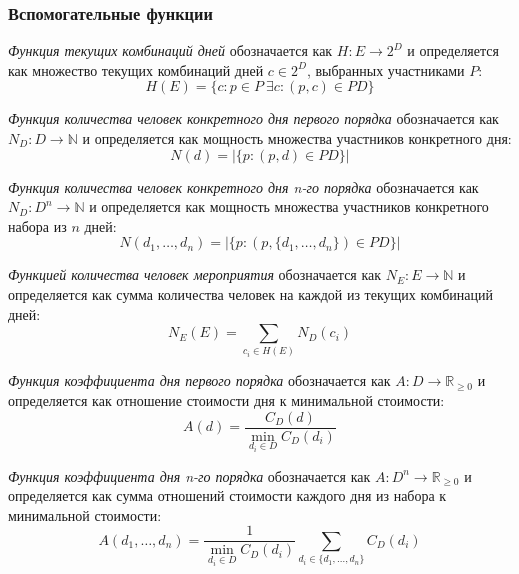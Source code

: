 \subsubsection{Вспомогательные функции}

\textit{Функция текущих комбинаций дней} обозначается как $H: E \rightarrow 2^D$ и определяется как множество текущих комбинаций дней $c \in 2^D$, выбранных участниками $P$:
\begin{equation}
	H(E) = \{c: p \in P \ \exists c: (p, c) \in PD\}
\end{equation}

\textit{Функция количества человек конкретного дня первого порядка} обозначается как $N_D: D \rightarrow \mathbb{N}$ и определяется как мощность множества участников конкретного дня:
\begin{equation}
	N(d) = |\{p: (p, d) \in PD\}|
\end{equation}

\textit{Функция количества человек конкретного дня n-го порядка} обозначается как $N_D: D^n \rightarrow \mathbb{N}$ и определяется как мощность множества участников конкретного набора из $n$ дней:
\begin{equation}
	N(d_1, \dots, d_n) = |\{p: (p, \{d_1, \dots, d_n\}) \in PD\}|
\end{equation}

\textit{Функцией количества человек мероприятия} обозначается как \newline $N_E: E \rightarrow \mathbb{N}$ и определяется как сумма количества человек на каждой из текущих комбинаций дней:
\begin{equation}
	N_E(E) = \sum_{c_i \in H(E)}{N_D(c_i)}
\end{equation}

\textit{Функция коэффициента дня первого порядка} обозначается как \newline $A: D \rightarrow \mathbb{R}_{\ge 0}$ и определяется как отношение стоимости дня к минимальной стоимости:
\begin{equation}
	A(d) = \frac{C_D(d)}{\min_{d_i \in D}{C_D(d_i)}}
\end{equation}

\textit{Функция коэффициента дня n-го порядка} обозначается как \newline $A: D^n \rightarrow \mathbb{R}_{\ge 0}$ и определяется как сумма отношений стоимости каждого дня из набора к минимальной стоимости:
\begin{equation}
	A(d_1, \dots, d_n) = \frac{1}{\min_{d_i \in D}{C_D(d_i)}}\sum_{d_i \in \{d_1, \dots, d_n\}}{C_D(d_i)}
\end{equation}

